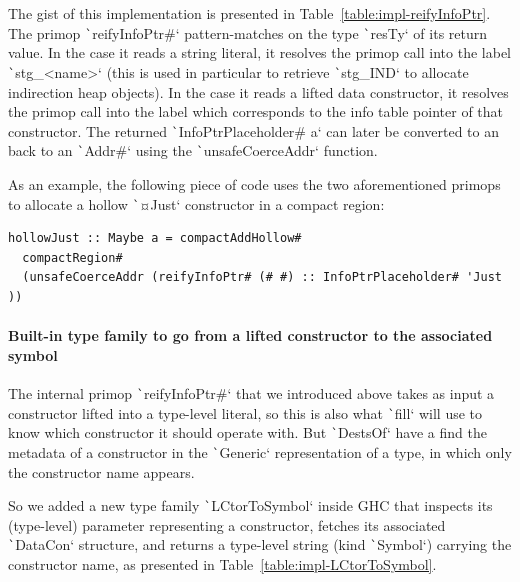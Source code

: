 \documentclass[english]{jflart}
\newlength{\currentparskip}
\newenvironment{unbreakable}
{%
  \setlength{\currentparskip}{\parskip}%
  \setlength{\parskip}{\currentparskip}%
  \par\vspace{0.5\baselineskip}%
  \noindent\begin{minipage}{\textwidth}%
    \setlength{\parskip}{\currentparskip}%
}
{%
  \end{minipage}%
  \par\vspace{0.5\baselineskip}%
}
\begin{document}
The gist of this implementation is presented in Table~\ref{table:impl-reifyInfoPtr}. The primop \texttt`reifyInfoPtr#` pattern-matches on the type \texttt`resTy` of its return value. In the case it reads a string literal, it resolves the primop call into the label \texttt`stg_<name>` (this is used in particular to retrieve \texttt`stg_IND` to allocate indirection heap objects). In the case it reads a lifted data constructor, it resolves the primop call into the label which corresponds to the info table pointer of that constructor. The returned \texttt`InfoPtrPlaceholder# a` can later be converted to an back to an \texttt`Addr#` using the \texttt`unsafeCoerceAddr` function.

As an example, the following piece of code uses the two aforementioned primops to allocate a hollow \texttt`¤Just` constructor in a compact region:

\begin{unbreakable}
{\small
\begin{verbatim}
hollowJust :: Maybe a = compactAddHollow#
  compactRegion#
  (unsafeCoerceAddr (reifyInfoPtr# (# #) :: InfoPtrPlaceholder# 'Just ))
\end{verbatim}
}
\end{unbreakable}

\paragraph{Built-in type family to go from a lifted constructor to the associated symbol}

The internal primop \texttt`reifyInfoPtr#` that we introduced above takes as input a constructor lifted into a type-level literal, so this is also what \texttt`fill` will use to know which constructor it should operate with. But \texttt`DestsOf` have a find the metadata of a constructor in the \texttt`Generic` representation of a type, in which only the constructor name appears.

So we added a new type family \texttt`LCtorToSymbol` inside GHC that inspects its (type-level) parameter representing a constructor, fetches its associated \texttt`DataCon` structure, and returns a type-level string (kind \texttt`Symbol`) carrying the constructor name, as presented in Table~\ref{table:impl-LCtorToSymbol}.
\end{document}
